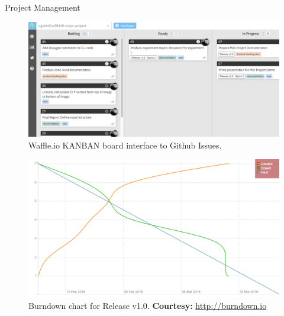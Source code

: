 \documentclass[10pt, compress]{beamer}
\begin{document}
\begin{frame}{Project Management}

\begin{figure}[ht!]
\centering
\includegraphics[scale=0.12]{waffle.png}
\caption{Waffle.io KANBAN board interface to Github Issues.}
\end{figure}

\begin{figure}[ht!]
\centering
\includegraphics[scale=0.12]{burndown.png}
\caption{Burndown chart for Release v1.0. \textbf{Courtesy:} \href{http://burndown.io}{http://burndown.io}}
\end{figure}

\end{frame}

\end{document}
